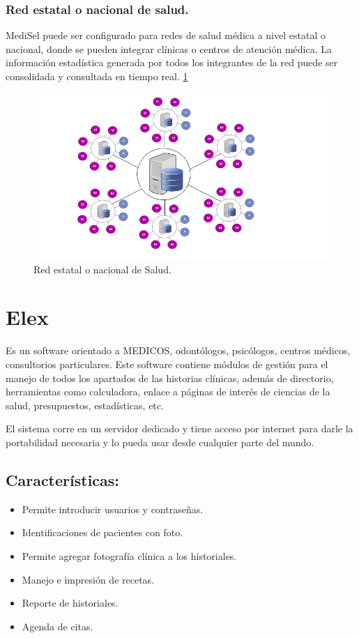 \subsubsection{Red estatal o nacional de salud.}
MediSel puede ser configurado para redes de salud médica a nivel estatal o nacional, donde se pueden integrar clínicas o centros de atención médica. La información estadística generada por todos los integrantes de la red puede ser consolidada y consultada en tiempo real. \cite{esquemas} \ref{figura6}

\begin{figure}[h]
  \label{figura6}
  \centering
  \includegraphics[scale=.35]{lib/assets/6}
  \caption{Red estatal o nacional de Salud.}
\end{figure}



\section{Elex}
Es un software orientado a MEDICOS, odontólogos, psicólogos, centros médicos, consultorios particulares. Este software contiene módulos de gestión para el manejo de todos los apartados de las historias clínicas, además de directorio, herramientas como calculadora, enlace a páginas de interés de ciencias de la salud, presupuestos, estadísticas, etc.\cite{elex}

El sistema corre en un servidor dedicado y tiene acceso por internet para darle la portabilidad necesaria y lo pueda usar desde cualquier parte del mundo.
\subsection{Características:}
  \begin{itemize}
    \item Permite introducir usuarios y contraseñas.
    \item Identificaciones de pacientes con foto.
    \item Permite agregar fotografía clínica a los historiales.
    \item Manejo e impresión de recetas.
    \item Reporte de historiales.
    \item Agenda de citas.

  \end{itemize}


